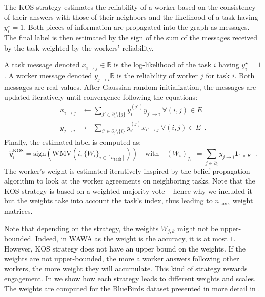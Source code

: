 \documentclass{cap2024}
\begin{document}
\begin{itemize}
  The KOS strategy estimates the reliability of a worker based on the consistency of their answers with those of their neighbors and the likelihood of a task having $y_i^\star=1$.
  Both pieces of information are propagated into the graph as messages.
  The final label is then estimated by the sign of the sum of the messages received by the task weighted by the workers' reliability.

  A task message denoted $x_{i\rightarrow j}\in\mathbb{R}$ is the log-likelihood of the task $i$ having $y_i^\star=1$.
  A worker message denoted $y_{j\rightarrow i}\mathbb{R}$ is the reliability of worker $j$ for task $i$.
  Both messages are real values.
  After Gaussian random initialization, the messages are updated iteratively until convergence following the equations:
  \begin{align*}
      x_{i\rightarrow j} &\gets \sum_{j'\in \partial_i\setminus \{j\}} y_i^{(j')}y_{j'\rightarrow i} \ \forall (i,j)\in E \\
      y_{j\rightarrow i} &\gets \sum_{i'\in \partial_j\setminus \{i\}} y_{i'}^{(j)} x_{i'\rightarrow j} \ \forall (i,j)\in E\enspace.
  \end{align*}
  Finally, the estimated label is computed as:
  \begin{equation}
    \hat y_i^{\text{KOS}} = \mathrm{sign}\left(\mathrm{WMV}(i, \{W_i\}_{i\in [n_\texttt{task}]} )\right)\quad \text{with}\quad (W_i)_{j,:}=\sum_{j\in\partial_i}y_{j\rightarrow i}\mathbf{1}_{1\times K}\enspace.
  \end{equation}
  The worker's weight is estimated iteratively inspired by the belief propagation algorithm to look at the worker agreements on neighboring tasks.
  Note that the KOS strategy is based on a weighted majority vote -- hence why we included it -- but the weights take into account the task's index, thus leading to $n_\texttt{task}$ weight matrices.

\end{itemize}
Note that depending on the strategy, the weights $W_{j,k}$ might not be upper-bounded. Indeed, in WAWA as the weight is the accuracy, it is at most $1$. However, KOS strategy does not have an upper bound on the weights.
If the weights are not upper-bounded, the more a worker answers following other workers, the more weight they will accumulate. This kind of strategy rewards engagement.
In  we show how each strategy leads to different weights and scales. The weights are computed for the BlueBirds dataset \citep{WelinderEtal10b} presented in more detail in .
\end{document}
